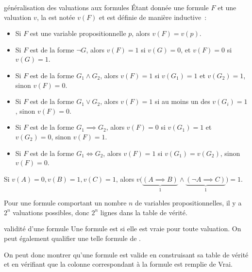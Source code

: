 \begin{proposition}{}{généralisation des valuations aux formules}
    Étant donnée une formule $F$ et une valuation $v$, la  est notée $v(F)$ et est définie de manière inductive~:
    \begin{itemize}
        \item Si $F$ est une variable propositionnelle $p$, alors $v(F) = v(p)$.
        \item Si $F$ est de la forme $\neg G$, alors $v(F) = 1$ si $v(G) = 0$, et $v(F) = 0$ si $v(G) = 1$.
        \item Si $F$ est de la forme $G_1 \land G_2$, alors $v(F) = 1$ si $v(G_1) = 1$ et $v(G_2) = 1$, sinon $v(F) = 0$.
        \item Si $F$ est de la forme $G_1 \lor G_2$, alors $v(F) = 1$ si au moins un des $v(G_i) = 1$, sinon $v(F) = 0$.
        \item Si $F$ est de la forme $G_1 \implies G_2$, alors $v(F) = 0$ si $v(G_1) = 1$ et $v(G_2) = 0$, sinon $v(F) = 1$.
        \item Si $F$ est de la forme $G_1 \iff G_2$, alors $v(F) = 1$ si $v(G_1) = v(G_2)$, sinon $v(F) = 0$.
    \end{itemize}
\end{proposition}

\begin{exemple}{}{}
    Si $v(A) = 0, v(B) = 1, v(C) = 1$, alors $v\Big(\underbrace{(A \implies B)}_1 \land \underbrace{(\neg A \implies C)}_1\Big) = 1$.

\end{exemple}

\begin{remarque}{}{}
    Pour une formule comportant un nombre $n$ de variables propositionnelles, il y a $2^n$ valuations possibles, donc $2^n$ lignes dans la table de vérité.
\end{remarque}

\begin{definition}{}{validité d'une formule}
    Une formule est  si elle est vraie pour toute valuation. On peut également qualifier une telle formule de .
\end{definition}

\begin{remarque}{}{}
    On peut donc montrer qu'une formule est valide en construisant sa table de vérité et en vérifiant que la colonne correspondant à la formule est remplie de Vrai.
\end{remarque}


